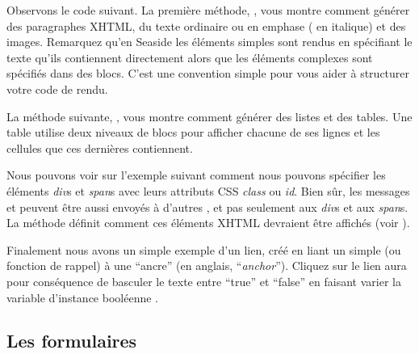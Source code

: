 \documentclass[a4paper,10pt,twoside]{book}
\begin{document}
Observons le code suivant.
La première méthode, , vous
montre comment générer des paragraphes XHTML, du texte ordinaire ou en
emphase (\ie{} en italique) et des images.
Remarquez qu'en Seaside les éléments simples sont rendus en spécifiant
le texte qu'ils contiennent directement alors que les éléments
complexes sont spécifiés dans des blocs.
C'est une convention simple pour vous aider à structurer votre code de
rendu.


La méthode suivante, ,
vous montre comment générer des listes et des tables.
Une table utilise deux niveaux de blocs pour afficher chacune
de ses lignes et les cellules que ces dernières contiennent.


Nous pouvons voir sur l'exemple suivant comment nous pouvons spécifier
les éléments \emph{div}s et \emph{span}s avec leurs attributs CSS
\emph{class} ou \emph{id}.
Bien sûr, les messages  et  peuvent être aussi
envoyés à d'autres \brushes, et pas seulement aux \emph{div}s et aux
\emph{span}s.
La méthode  définit comment ces éléments
XHTML devraient être affichés (voir ).


Finalement nous avons un simple exemple d'un lien, créé en liant un
simple  (ou fonction de rappel) à une
``ancre'' (en anglais, ``\emph{anchor}'').
Cliquez sur le lien aura pour conséquence de basculer le texte entre
``true'' et ``false'' en faisant varier la variable d'instance
booléenne .



\subsection{Les formulaires}
\end{document}
